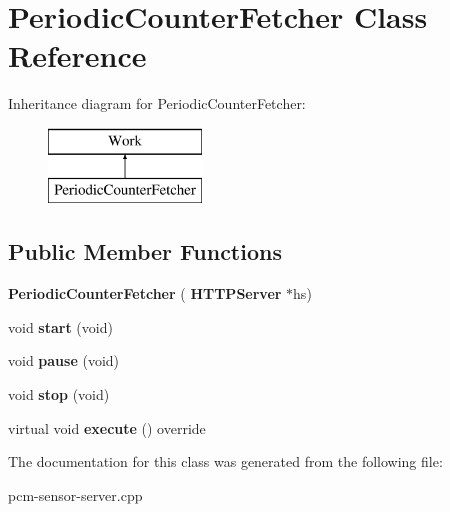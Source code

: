 \section{Periodic\+Counter\+Fetcher Class Reference}
\label{classPeriodicCounterFetcher}
Inheritance diagram for Periodic\+Counter\+Fetcher\+:\begin{figure}[H]
\begin{center}
\leavevmode
\includegraphics[height=2.000000cm]{classPeriodicCounterFetcher}
\end{center}
\end{figure}
\subsection*{Public Member Functions}
\begin{DoxyCompactItemize}
\item 
\mbox{\label{classPeriodicCounterFetcher_a29da24dd8f8fe4974ecc5cea984eb9ff}} 
{\bfseries Periodic\+Counter\+Fetcher} (\textbf{ H\+T\+T\+P\+Server} $\ast$hs)
\item 
\mbox{\label{classPeriodicCounterFetcher_a1d2622da96f401c33dd5b87c30fe0c32}} 
void {\bfseries start} (void)
\item 
\mbox{\label{classPeriodicCounterFetcher_af5038bb3070443d550ab9c85cc9fa896}} 
void {\bfseries pause} (void)
\item 
\mbox{\label{classPeriodicCounterFetcher_a0889f6207974b6b99f70c5e5f08cb312}} 
void {\bfseries stop} (void)
\item 
\mbox{\label{classPeriodicCounterFetcher_adcf7f2f3e4ca32c8a74013178d1c317a}} 
virtual void {\bfseries execute} () override
\end{DoxyCompactItemize}


The documentation for this class was generated from the following file\+:\begin{DoxyCompactItemize}
\item 
pcm-\/sensor-\/server.\+cpp\end{DoxyCompactItemize}
